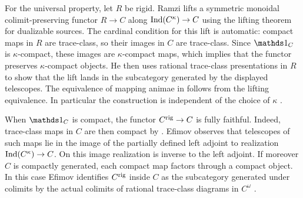 	For the universal property, let $R$ be rigid. Ramzi lifts a symmetric monoidal colimit-preserving functor $R\to C$ along $\operatorname{Ind}(C^\kappa)\to C$ using the lifting theorem for dualizable sources. The cardinal condition for this lift is automatic: compact maps in $R$ are trace-class, so their images in $C$ are trace-class. Since $\unit_C$ is $\kappa$-compact, these images are $\kappa$-compact maps, which implies that the functor preserves $\kappa$-compact objects. He then uses rational trace-class presentations in $R$ to show that the lift lands in the subcategory generated by the displayed telescopes. The equivalence of mapping animae in  follows from the lifting equivalence. In particular the construction is independent of the choice of $\kappa$ \cite[Theorem~4.81]{Ramzi_Locally_Rigid}.

	When $\unit_C$ is compact, the functor $C^{\mathrm{rig}}\to C$ is fully faithful. Indeed, trace-class maps in $C$ are then compact by . Efimov observes that telescopes of such maps lie in the image of the partially defined left adjoint to realization $\operatorname{Ind}(C^\kappa)\to C$. On this image realization is inverse to the left adjoint. If moreover $C$ is compactly generated, each compact map factors through a compact object. In this case Efimov identifies $C^{\mathrm{rig}}$ inside $C$ as the subcategory generated under colimits by the actual colimits of rational trace-class diagrams in $C^\omega$ \cite[Proposition~1.23 and Remark~1.24(i)]{Efimov_Inverse_Limits}.


